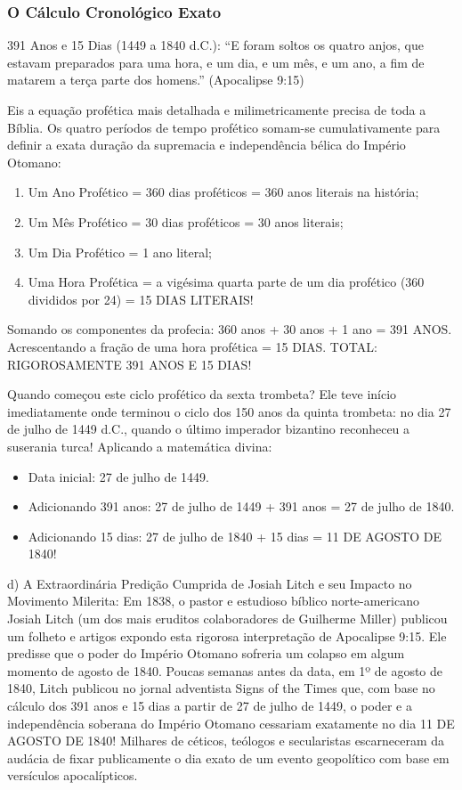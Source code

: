 \documentclass[11pt,a4paper,openany]{book}
\begin{document}
\subsubsection*{O Cálculo Cronológico Exato}
391 Anos e 15 Dias (1449 a 1840 d.C.):
``E foram soltos os quatro anjos, que estavam preparados para uma hora, e um dia, e um mês, e um ano, a fim de matarem a terça parte dos homens.'' (Apocalipse 9:15)

Eis a equação profética mais detalhada e milimetricamente precisa de toda a Bíblia. Os quatro períodos de tempo profético somam-se cumulativamente para definir a exata duração da supremacia e independência bélica do Império Otomano:
\begin{enumerate}
  \item Um Ano Profético = 360 dias proféticos = 360 anos literais na história;
  \item Um Mês Profético = 30 dias proféticos = 30 anos literais;
  \item Um Dia Profético = 1 ano literal;
  \item Uma Hora Profética = a vigésima quarta parte de um dia profético (360 divididos por 24) = 15 DIAS LITERAIS!
\end{enumerate}


Somando os componentes da profecia:
360 anos + 30 anos + 1 ano = 391 ANOS.
Acrescentando a fração de uma hora profética = 15 DIAS.
TOTAL: RIGOROSAMENTE 391 ANOS E 15 DIAS!

Quando começou este ciclo profético da sexta trombeta?
Ele teve início imediatamente onde terminou o ciclo dos 150 anos da quinta trombeta: no dia 27 de julho de 1449 d.C., quando o último imperador bizantino reconheceu a suserania turca!
Aplicando a matemática divina:
\begin{itemize}
  \item Data inicial: 27 de julho de 1449.
  \item Adicionando 391 anos: 27 de julho de 1449 + 391 anos = 27 de julho de 1840.
  \item Adicionando 15 dias: 27 de julho de 1840 + 15 dias = 11 DE AGOSTO DE 1840!
\end{itemize}


d) A Extraordinária Predição Cumprida de Josiah Litch e seu Impacto no Movimento Milerita:
Em 1838, o pastor e estudioso bíblico norte-americano Josiah Litch (um dos mais eruditos colaboradores de Guilherme Miller) publicou um folheto e artigos expondo esta rigorosa interpretação de Apocalipse 9:15. Ele predisse que o poder do Império Otomano sofreria um colapso em algum momento de agosto de 1840. Poucas semanas antes da data, em 1º de agosto de 1840, Litch publicou no jornal adventista Signs of the Times que, com base no cálculo dos 391 anos e 15 dias a partir de 27 de julho de 1449, o poder e a independência soberana do Império Otomano cessariam exatamente no dia 11 DE AGOSTO DE 1840! Milhares de céticos, teólogos e secularistas escarneceram da audácia de fixar publicamente o dia exato de um evento geopolítico com base em versículos apocalípticos.
\end{document}
